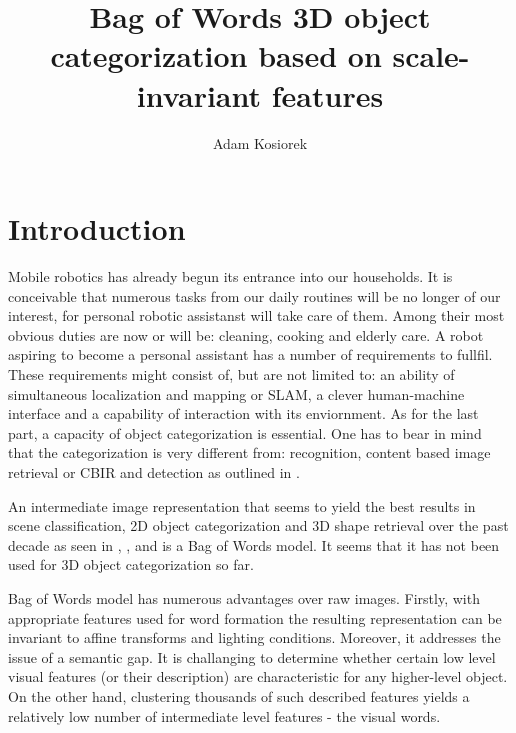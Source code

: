 \documentclass[a4paper,10pt]{article}
\title{Bag of Words 3D object categorization based on scale-invariant features}
\author{Adam Kosiorek}
\begin{document}
\maketitle

\begin{abstract}

\end{abstract}
 

\section{Introduction}

  Mobile robotics has already begun its entrance into our households. It is conceivable that numerous tasks from our daily routines will be no
  longer of our interest, for personal robotic assistanst will take care of them. Among their most obvious duties are now or will be:
  cleaning, cooking  and elderly care. A robot aspiring to become a personal assistant has a number of requirements to fullfil. These 
  requirements might consist of, but are not limited to: an ability of simultaneous localization and mapping or SLAM, a clever human-machine 
  interface and a capability of interaction with its enviornment. As for the last part, a capacity of object categorization is essential. One 
  has to bear in mind that the categorization is very different from: recognition, content based image retrieval or CBIR and detection as outlined
  in \cite{csurka2004visual}. 
  
  An intermediate image representation that seems to yield the best results in scene classification, 2D object categorization and 3D shape retrieval
  over the past decade as seen in \cite{fei2005bayesian}, \cite{csurka2004visual}, \cite{li2010investigating} and \cite{tsai2012bag}
  is a Bag of Words model. It seems that it has not been used for 3D object categorization so far.
  
  Bag of Words model has numerous advantages over raw images. Firstly, with appropriate features used for word formation the resulting 
  representation can be invariant to affine transforms and lighting conditions. Moreover, it addresses the issue of a semantic gap. It is 
  challanging to determine whether certain low level visual features (or their description) are characteristic for any higher-level object.
  On the other hand, clustering thousands of such described features yields a relatively low number of intermediate level features - the visual words.
  
\end{document}
